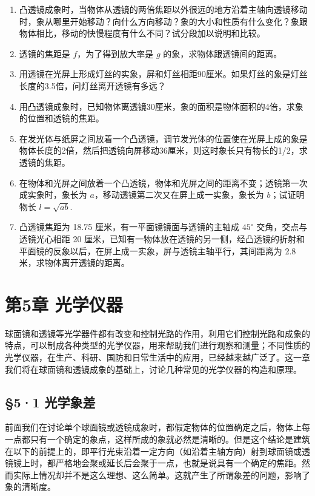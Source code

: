 \begin{enumerate}
\item
  凸透镜成象时，当物体从透镜的两倍焦距以外很远的地方沿着主轴向透镜移动时，象从哪里开始移动？向什么方向移动？象的大小和性质有什么变化？象跟物体相比，移动的快慢程度有什么不同？试分段加以说明和比较。
\item
  透镜的焦距是 \(f\)，为了得到放大率是 \(g\)
  的象，求物体跟透镜间的距离。
\item
  用透镜在光屏上形成灯丝的实象，屏和灯丝相距90厘米。如果灯丝的象是灯丝长度的3.5倍，问灯丝离开透镜有多远？
\item
  用凸透镜成象时，已知物体离透镜30厘米，象的面积是物体面积的4倍，求象的位置和透镜的焦距。
\item
  在发光体与纸屏之间放着一个凸透镜，调节发光体的位置使在光屏上成的象是物体长度的2倍，然后把透镜向屏移动36厘米，则这时象长只有物长的1/2，求透镜的焦距。
\item
  在物体和光屏之间放着一个凸透镜，物体和光屏之间的距离不变；透镜第一次成实象时，象长为
  \(a\)，移动透镜第二次又在屏上成一实象，象长为 \(b\)；试证明物长
  \(l = \sqrt{ab}\).
\item
  凸透镜焦距为 18.75 厘米，有一平面镜镜面与透镜的主轴成 \(45^{\circ}\)
  交角，交点与透镜光心相距 20
  厘米，已知有一物体放在透镜的另一侧，经凸透镜的折射和平面镜的反象以后，在屏上成一实象，屏与透镜主轴平行，其间距离为
  2.8 米，求物体离开透镜的距离。
\end{enumerate}

\chapter{第5章 光学仪器}

球面镜和透镜等光学器件都有改变和控制光路的作用，利用它们控制光路和成象的特点，可以制成各种类型的光学仪器，用来帮助我们进行观察和测量；不同性质的光学仪器，在生产、科研、国防和日常生活中的应用，已经越来越广泛了。这一章我们将在球面镜和透镜成象的基础上，讨论几种常见的光学仪器的构造和原理。

\section{§5·1 光学象差}

前面我们在讨论单个球面镜或透镜成象时，都假定物体的位置确定之后，物体上每一点都只有一个确定的象点，这样所成的象就必然是清晰的。但是这个结论是建筑在以下的前提上的，即平行光束沿着一定方向（如沿着主轴方向）射到球面镜或透镜镜上时，都严格地会聚或延长后会聚于一点，也就是说具有一个确定的焦距。然而实际上情况却并不是这么理想、这么简单。这就产生了所谓象差的问题，影响了象的清晰度。

